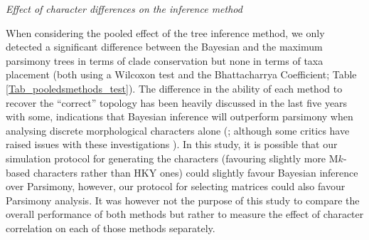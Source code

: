 \documentclass[12pt,letterpaper]{article}
\renewcommand{\subsection}[1]{%
\bigskip
\begin{center}
\begin{large}
\normalfont\itshape #1
\end{large}
\end{center}}
\begin{document}
\subsection{Effect of character differences on the inference method}
When considering the pooled effect of the tree inference method, we only detected a significant difference between the Bayesian and the maximum parsimony trees in terms of clade conservation but none in terms of taxa placement (both using a Wilcoxon test and the Bhattacharrya Coefficient; Table \ref{Tab_pooledsmethods_test}).
The difference in the ability of each method to recover the ``correct'' topology has been heavily discussed in the last five years with some, indications that Bayesian inference will outperform parsimony when analysing discrete morphological characters alone (\citealt{wrightbayesian2014,OReilly20160081,puttick2017uncertain}; although some critics have raised issues with these investigations \citealt{spencerefficacy2013,goloboff2017weighted}).
In this study, it is possible that our simulation protocol for generating the characters (favouring slightly more M$k$-based characters rather than HKY ones) could slightly favour Bayesian inference over Parsimony, however, our protocol for selecting matrices \citep[i.e. those with in a $CI<0.26$ in a quick preliminary parsimony search;][]{OReilly20160081} could also favour Parsimony analysis.
It was however not the purpose of this study to compare the overall performance of both methods but rather to measure the effect of character correlation on each of those methods separately.
\end{document}
